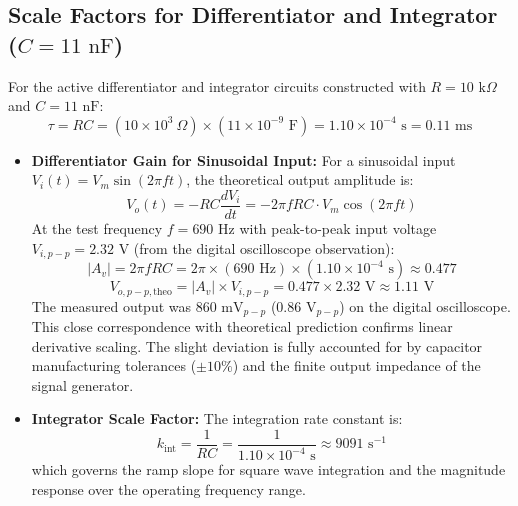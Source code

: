 \documentclass[12pt,a4paper]{article}
\begin{document}
\subsection{Scale Factors for Differentiator and Integrator ($C = 11\text{ nF}$)}
For the active differentiator and integrator circuits constructed with $R = 10\text{ k}\Omega$ and $C = 11\text{ nF}$:
\begin{equation}
    \tau = RC = (10 \times 10^3\ \Omega) \times (11 \times 10^{-9}\text{ F}) = 1.10 \times 10^{-4}\text{ s} = 0.11\text{ ms}
\end{equation}
\begin{itemize}
    \item \textbf{Differentiator Gain for Sinusoidal Input:}
    For a sinusoidal input $V_i(t) = V_m \sin(2\pi f t)$, the theoretical output amplitude is:
    \begin{equation}
        V_o(t) = -RC \frac{dV_i}{dt} = -2\pi f RC \cdot V_m \cos(2\pi f t)
    \end{equation}
    At the test frequency $f = 690\text{ Hz}$ with peak-to-peak input voltage $V_{i,p-p} = 2.32\text{ V}$ (from the digital oscilloscope observation):
    \begin{equation}
        |A_v| = 2\pi f RC = 2\pi \times (690\text{ Hz}) \times (1.10 \times 10^{-4}\text{ s}) \approx 0.477
    \end{equation}
    \begin{equation}
        V_{o,p-p,\text{theo}} = |A_v| \times V_{i,p-p} = 0.477 \times 2.32\text{ V} \approx 1.11\text{ V}
    \end{equation}
    The measured output was $860\text{ mV}_{p-p}$ ($0.86\text{ V}_{p-p}$) on the digital oscilloscope. This close correspondence with theoretical prediction confirms linear derivative scaling. The slight deviation is fully accounted for by capacitor manufacturing tolerances ($\pm 10\%$) and the finite output impedance of the signal generator.
    
    \item \textbf{Integrator Scale Factor:}
    The integration rate constant is:
    \begin{equation}
        k_{\text{int}} = \frac{1}{RC} = \frac{1}{1.10 \times 10^{-4}\text{ s}} \approx 9091\text{ s}^{-1}
    \end{equation}
    which governs the ramp slope for square wave integration and the magnitude response over the operating frequency range.
\end{itemize}
\end{document}
